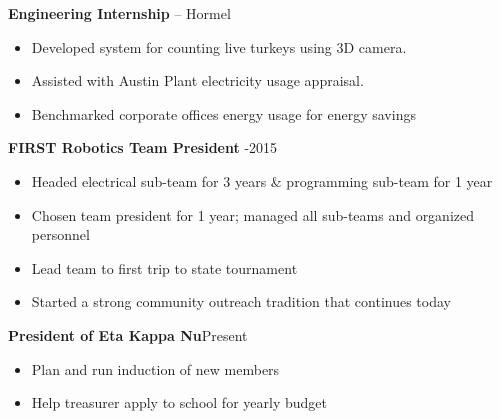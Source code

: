 \documentclass{article}
\begin{document}
\begin{minipage}[t]{15cm}
\vspace{0.2cm}
\textbf{Engineering Internship} -- Hormel  

\begin{itemize}
\itemsep-0.3em
\item Developed system for counting live turkeys using 3D camera.
\item Assisted with Austin Plant electricity usage appraisal.
\item Benchmarked corporate offices energy usage for energy savings
\end{itemize}

\vspace{0.5cm}


\vspace{0.2cm}
{\textbf{FIRST Robotics Team President} -2015}
\begin{itemize}
\itemsep-0.3em
\item Headed electrical sub-team for 3 years \& programming sub-team for 1 year
\item Chosen team president for 1 year; managed all sub-teams and organized personnel
\item Lead team to first trip to state tournament
\item Started a strong community outreach tradition that continues today
\end{itemize}

\vspace{0.2cm}
{\textbf{President of Eta Kappa Nu}\dotfill Present}

\begin{itemize}
\itemsep-0.3em
\item Plan and run induction of new members
\item Help treasurer apply to school for yearly budget
\end{itemize}



\end{minipage}%
%
\end{document}
